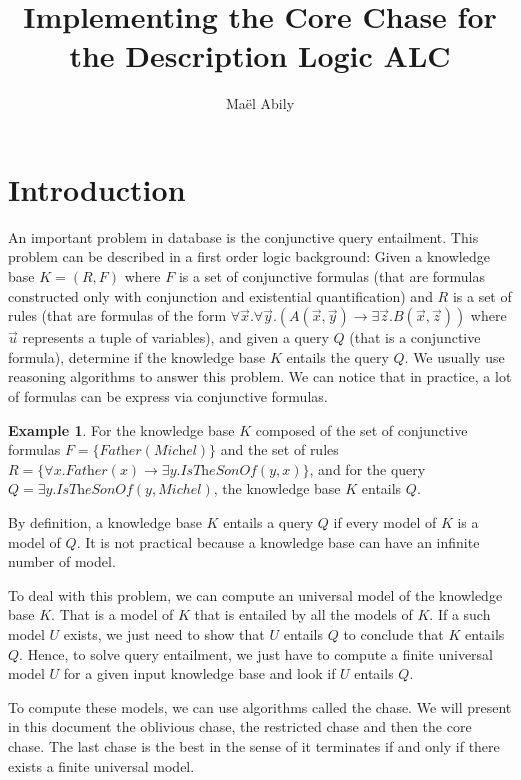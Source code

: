 \documentclass{article}
\title{Implementing the Core Chase for the Description Logic ALC}
\author{Maël Abily}
\theoremstyle{definition}
\newtheorem{example}{Example}[section]
\theoremstyle{remark}
\begin{document}
\maketitle						%



\section{Introduction}

An important problem in database is the conjunctive query entailment. This problem can be described in a first order logic background: Given a knowledge base $K = (R,F)$ where $F$ is a set of conjunctive formulas (that are formulas constructed only with conjunction and existential quantification) and $R$ is a set of  rules (that are formulas of the form $\forall \vec x.\forall \vec y.( A(\vec x,\vec y) \rightarrow \exists \vec z. B(\vec x,\vec z))$ where $\vec u$ represents a tuple of variables), and given a query $Q$ (that is a conjunctive formula), determine if the knowledge base $K$ entails the query $Q$. We usually use reasoning algorithms to answer this problem. We can notice that in practice, a lot of formulas can be express via conjunctive formulas.

\begin{example}
For the knowledge base $K$ composed of the set of conjunctive formulas $F = \{\textit{Father}(\textit{Michel}) \}$ and the set of rules $R= \{\forall x. \textit{Father}(x) \rightarrow \exists y. \textit{IsTheSonOf}(y,x) \}$, and for the query $Q = \exists y. \textit{IsTheSonOf}(y,Michel)$, the knowledge base $K$ entails $Q$.
\end{example}

By definition, a knowledge base $K$ entails a query $Q$ if every  model of $K$ is a model of $Q$. It is not practical because a knowledge base can have an infinite number of model.

To deal with this problem, we can compute an universal model of the knowledge base $K$. That is a model of $K$ that is entailed by all the models of $K$. If a such model $U$ exists, we just need to show that $U$ entails $Q$ to conclude that $K$ entails $Q$. Hence, to solve query entailment, we just have to compute a finite universal model $U$ for a given input knowledge base and look if $U$ entails $Q$.

To compute these models, we can use algorithms called the chase. We will present in this document the oblivious chase, the restricted chase and then the core chase. The last chase is the best in the sense of it terminates if and only if there exists a finite universal model. 
\end{document}
